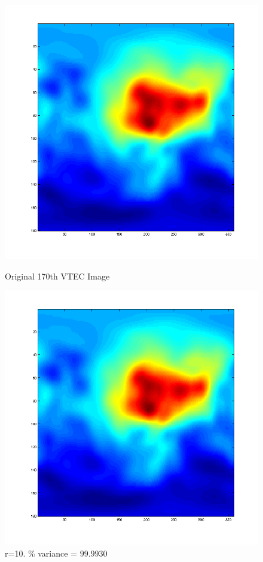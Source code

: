 \documentclass[12pt,english]{article}
\begin{document}
\begin{figure}
\begin{minipage}{0.5\linewidth}
    \includegraphics[width=\linewidth]{pca-part-c-VTEC_Images-original.png}
    \caption{Original 170th VTEC Image}
\end{minipage}
\begin{minipage}{0.5\linewidth}
    \includegraphics[width=\linewidth]{pca-part-c-VTEC_Images-reconstructed-r=10.png}
    \caption{r=10. \% variance = $99.9930$}
\end{minipage}
\end{figure}
\end{document}
